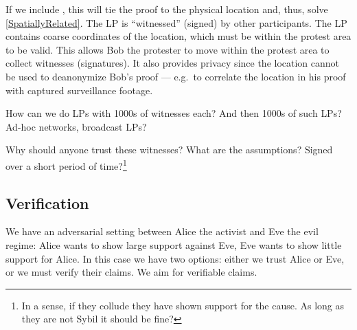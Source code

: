 If we include , this will tie the proof to the physical location and, 
thus, solve \cref{SpatiallyRelated}.
The \ac{LP} is \enquote{witnessed} (signed) by other participants.
The \ac{LP} contains coarse coordinates of the location, which must be within 
the protest area to be valid.
This allows Bob the protester to move within the protest area to collect 
witnesses (signatures).
It also provides privacy since the location cannot be used to deanonymize Bob's 
proof --- e.g.\ to correlate the location in his proof with captured 
surveillance footage.

\begin{frame}

  \pause

  \begin{question}
    How can we do \acp{LP} with 1000s of witnesses each?
    And then 1000s of such \acp{LP}?
    Ad-hoc networks, broadcast \acp{LP}?
  \end{question}
  \begin{question}
    Why should anyone trust these witnesses?
    What are the assumptions?
    Signed over a short period of time?\footnote{%
      In a sense, if they collude they have shown support for the cause.
      As long as they are not Sybil it should be fine?
    }
  \end{question}
\end{frame}

\subsection{Verification}
\label{Verification}

We have an adversarial setting between Alice the activist and Eve the evil 
regime: Alice wants to show large support against Eve, Eve wants to show little
support for Alice.
In this case we have two options:
either we trust Alice or Eve, or we must verify their claims.
We aim for verifiable claims.

